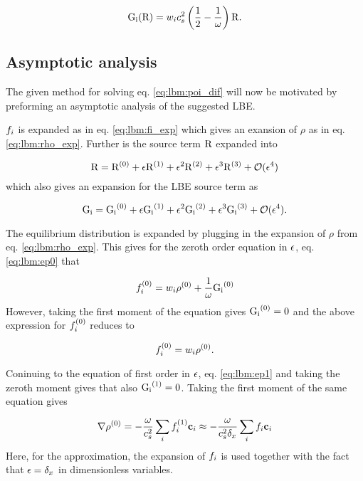 \begin{equation}\label{eq:lbm:gi}
\mathrm{G_i}(\mathrm{R}) = w_ic_s^2 \left( \frac{1}{2} - \frac{1}{\omega} \right)\mathrm{R}.
\end{equation}

\subsection{Asymptotic analysis}\label{sec:lbm:asym_pe}
The given method for solving eq. \eqref{eq:lbm:poi_dif} will now be
motivated by preforming an asymptotic analysis of the suggested LBE.

$f_i$ is expanded as in eq. \eqref{eq:lbm:fi_exp} which gives an
exansion of $\rho$ as in eq. \eqref{eq:lbm:rho_exp}. Further is 
the source term $\mathrm{R}$ expanded into 

\begin{equation}\label{eq:lbm:R_exp}
\mathrm{R} = \mathrm{\mathrm{R}}^{(0)} + \epsilon\mathrm{\mathrm{R}}^{(1)} + \epsilon^2\mathrm{\mathrm{R}}^{(2)} + \epsilon^3\mathrm{\mathrm{R}}^{(3)} + \mathcal{O}(\epsilon^4)
\end{equation} 
which also gives an expansion for the LBE source term as

\begin{equation}\label{eq:lbm:G_exp}
\mathrm{G_i} = \mathrm{G_i}^{(0)} + \epsilon\mathrm{G_i}^{(1)} + \epsilon^2\mathrm{G_i}^{(2)} + \epsilon^3\mathrm{G_i}^{(3)} + \mathcal{O}(\epsilon^4).
\end{equation} 

The equilibrium distribution is expanded by plugging in the expansion
of $\rho$ from eq. \eqref{eq:lbm:rho_exp}. This gives for the zeroth
order equation in $\epsilon$, eq. \eqref{eq:lbm:ep0} that

\begin{equation}
f_i^{(0)} = w_i\rho^{(0)} + \frac{1}{\omega}\mathrm{G_i}^{(0)}
\end{equation}
However, taking the first moment of the equation gives $\mathrm{G_i}^{(0)} = 0$
and the above expression for $f_i^{(0)}$ reduces to

\begin{equation}
f_i^{(0)} = w_i\rho^{(0)}.
\end{equation}

Coninuing to the equation of first order in $\epsilon$,
eq. \eqref{eq:lbm:ep1} and taking the zeroth moment gives that also
$\mathrm{G_i}^{(1)} = 0$. Taking the first moment of the same equation  gives

\begin{equation}
\nabla \rho^{(0)} = - \frac{\omega}{c_s^2} \sum_i f_i^{(1)} \mathbf{c}_i \approx -
\frac{\omega}{c_s^2 \delta_x} \sum_i f_i \mathbf{c}_i
\end{equation}
Here, for the approximation, the expansion of $f_i$ is used together
with the fact that $\epsilon = \delta_x$ in dimensionless variables.

